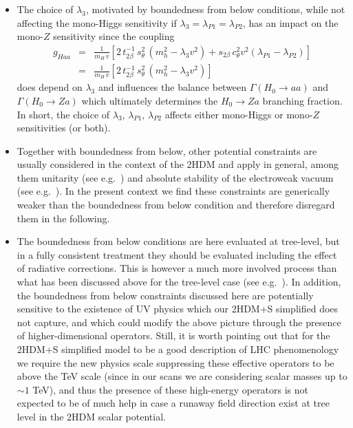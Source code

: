 \begin{itemize}
    \begin{itemize}
     \item The choice of $\lambda_3$, motivated by boundedness from below conditions, while not affecting the mono-Higgs sensitivity 
    if $\lambda_3 = \lambda_{P1} = \lambda_{P2}$, has an impact on the mono-$Z$ sensitivity since the coupling 
    \begin{eqnarray}
     g_{Haa} &=& \frac{1}{m_{H} \,v} \left[ 2\, t_{2\beta}^{-1}\, s_{\theta}^2\, 
(m_h^2 - \lambda_3 v^2) + s_{2\beta}\, c_{\theta}^2 v^2 (\lambda_{P1} - \lambda_{P2}) \right] \nonumber \\
      &=& \frac{1}{m_{H} \,v} \left[ 2\, t_{2\beta}^{-1}\, s_{\theta}^2\, 
(m_h^2 - \lambda_3 v^2) \right] 
    \end{eqnarray}
    does depend on $\lambda_3$ and influences the balance between $\Gamma(H_0 \to aa)$ and $\Gamma(H_0 \to Za)$ which ultimately determines the 
    $H_0 \to Za$ branching fraction. In short, the choice of $\lambda_3$, $\lambda_{P1}$, $\lambda_{P2}$ affects either mono-Higgs or mono-$Z$ sensitivities
    (or both).
    
    \item Together with boundedness from below, other potential constraints are usually considered in the context of the 2HDM and apply in general, 
    among them unitarity (see e.g.~\cite{Ginzburg:2005dt,Grinstein:2015rtl}) and absolute stability of the electroweak vacuum (see e.g.~\cite{Barroso:2013awa}). 
    In the present context we find these constraints 
    are generically weaker than the boundedness from below condition and therefore disregard them in the following. 
    
    \item The boundedness from below conditions are here evaluated at tree-level, but in a fully consistent treatment 
    they should be evaluated including the effect of radiative corrections. This is however 
    a much more involved process than what has been discussed above for the 
    tree-level case (see e.g.~\cite{Staub:2017ktc}). In addition, 
    the boundedness from below constraints discussed here are potentially sensitive to the 
    existence of UV physics which our 2HDM+S simplified does not capture, and which could modify the above picture through the presence of higher-dimensional 
    operators. Still, it is worth pointing out that for the 2HDM+S simplified model to be a good description of LHC phenomenology we require 
    the new physics scale suppressing these effective operators to be above the TeV scale (since in our scans we are considering scalar masses up to $\sim 1$ TeV), 
    and thus the presence of these high-energy operators is not expected to be of much help in case a runaway field direction exist at tree level in the 2HDM scalar 
    potential.
    \end{itemize}
    
    
    
    
\end{itemize}

